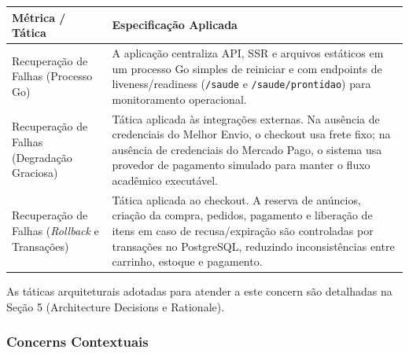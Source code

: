 ﻿\documentclass[12pt,a4paper]{article}
\begin{document}
\begin{longtable}{|p{4.5cm}|p{10cm}|}
\hline
\textbf{Métrica / Tática} & \textbf{Especificação Aplicada} \\
\hline
Recuperação de Falhas (Processo Go) & A aplicação centraliza API, SSR e arquivos estáticos em um processo Go simples de reiniciar e com endpoints de liveness/readiness (\texttt{/saude} e \texttt{/saude/prontidao}) para monitoramento operacional. \\
\hline
Recuperação de Falhas (Degradação Graciosa) & Tática aplicada às integrações externas. Na ausência de credenciais do Melhor Envio, o checkout usa frete fixo; na ausência de credenciais do Mercado Pago, o sistema usa provedor de pagamento simulado para manter o fluxo acadêmico executável. \\
\hline
Recuperação de Falhas (\textit{Rollback} e Transações) & Tática aplicada ao checkout. A reserva de anúncios, criação da compra, pedidos, pagamento e liberação de itens em caso de recusa/expiração são controladas por transações no PostgreSQL, reduzindo inconsistências entre carrinho, estoque e pagamento. \\
\hline
\end{longtable}

\noindent As táticas arquiteturais adotadas para atender a este concern são detalhadas na Seção 5 (Architecture Decisions e Rationale).

\subsubsection{Concerns Contextuais}
\end{document}
